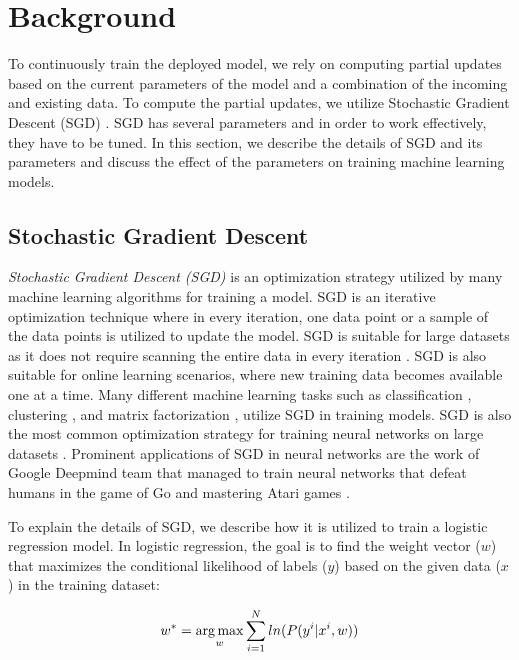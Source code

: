 \section{Background} \label{background}
To continuously train the deployed model, we rely on computing partial updates based on the current parameters of the model and a combination of the incoming and existing data.
To compute the partial updates, we utilize Stochastic Gradient Descent (SGD) \cite{zhang2004solving}.
SGD has several parameters and in order to work effectively, they have to be tuned.
In this section, we describe the details of SGD and its parameters and discuss the effect of the parameters on training machine learning models.

\subsection{Stochastic Gradient Descent} \label{sgd}
\textit{Stochastic Gradient Descent (SGD)} is an optimization strategy utilized by many machine learning algorithms for training a model.
SGD is an iterative optimization technique where in every iteration, one data point or a sample of the data points is utilized to update the model.
SGD is suitable for large datasets as it does not require scanning the entire data in every iteration \cite{bottou2010large}.
SGD is also suitable for online learning scenarios, where new training data becomes available one at a time.
Many different machine learning tasks such as classification \cite{zhang2004solving, macmahan2013}, clustering \cite{bottou1995convergence}, and matrix factorization \cite{koren2009matrix,  funk2006netflix}, utilize SGD in training models.
SGD is also the most common optimization strategy for training neural networks on large datasets \cite{dean2012large}.
Prominent applications of SGD in neural networks are the work of Google Deepmind team that managed to train neural networks that defeat humans in the game of Go \cite{silver2016mastering} and mastering Atari games \cite{mnih2013playing}.

To explain the details of SGD, we describe how it is utilized to train a logistic regression model.
In logistic regression, the goal is to find the weight vector ($w$) that maximizes the conditional likelihood of labels ($y$) based on the given data ($x$) in the training dataset:

\begin{center}
$$w^* = \operatorname*{arg\,max}_w \sum_{i=1}^{N} ln(P(y^i | x^i, w))$$
\end{center}

